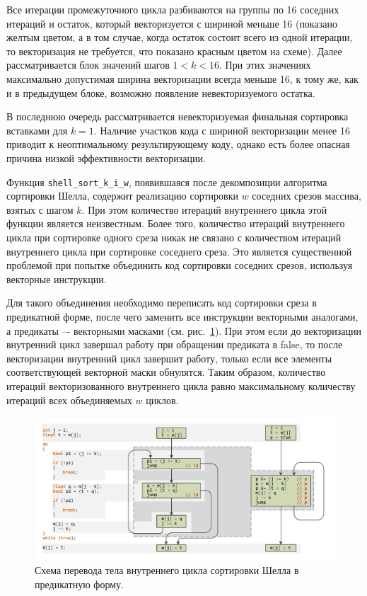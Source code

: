 Все итерации промежуточного цикла разбиваются на группы по 16 соседних итераций и остаток, который векторизуется с шириной меньше 16 (показано желтым цветом, а в том случае, когда остаток состоит всего из одной итерации, то векторизация не требуется, что показано красным цветом на схеме).
Далее рассматривается блок значений шагов $1 < k < 16$.
При этих значениях максимально допустимая ширина векторизации всегда меньше 16, к тому же, как и в предыдущем блоке, возможно появление невекторизуемого остатка.

В последнюю очередь рассматривается невекторизуемая финальная сортировка вставками для $k = 1$.
Наличие участков кода с шириной векторизации менее 16 приводит к неоптимальному результирующему коду, однако есть более опасная причина низкой эффективности векторизации\label{term:vec_eff5}.

Функция \texttt{shell\_sort\_k\_i\_w}, появившаяся после декомпозиции алгоритма сортировки Шелла, содержит реализацию сортировки $w$ соседних срезов массива, взятых с шагом $k$.
При этом количество итераций внутреннего цикла этой функции является неизвестным.
Более того, количество итераций внутреннего цикла при сортировке одного среза никак не связано с количеством итераций внутреннего цикла при сортировке соседнего среза.
Это является существенной проблемой при попытке объединить код сортировки соседних срезов, используя векторные инструкции.

Для такого объединения необходимо переписать код сортировки среза в предикатной форме\label{term:predicate_view4}, после чего заменить все инструкции векторными аналогами, а предикаты –- векторными масками\label{term:vector_mask8} (см. рис.~\ref{fig:text_4_vec_irreg_shell_cfg}).
При этом если до векторизации внутренний цикл завершал работу при обращении предиката в false, то после векторизации внутренний цикл завершит работу, только если все элементы соответствующей векторной маски обнулятся.
Таким образом, количество итераций векторизованного внутреннего цикла равно максимальному количеству итераций всех объединяемых $w$ циклов.

\begin{figure}[ht]
\centering
\includegraphics[width=1.0\textwidth]{./pics/text_4_vec_irreg/shell_cfg.pdf}
\singlespacing
{}\caption{Схема перевода тела внутреннего цикла сортировки Шелла в предикатную форму.}
\label{fig:text_4_vec_irreg_shell_cfg}
\end{figure}

